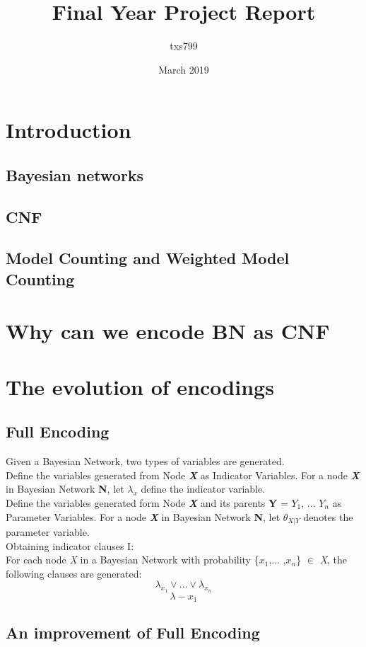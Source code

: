 \documentclass{article}
\title{Final Year Project Report}
\author{txs799 }
\date{March 2019}
\begin{document}
\maketitle

\section{Introduction}
\subsection{Bayesian networks}
\subsection{CNF}
\subsection{Model Counting and Weighted Model Counting}

\section{Why can we encode BN as CNF}

\section{The evolution of encodings}
\subsection{Full Encoding}
Given a Bayesian Network, two types of variables are generated.\\
Define the variables generated from Node \textbf{\textit{X}} as Indicator Variables.
For a node \textbf{\textit{X}} in Bayesian Network \textbf{N}, let $\lambda_x$ define the indicator variable. \\
Define the variables generated form Node \textbf{\textit{X}} and its parents \textbf{Y} = {$Y_{1}$, ... $Y_{n}$} as Parameter Variables.
For a node \textbf{\textit{X}} in Bayesian Network \textbf{N}, let $\theta_{X|Y}$ denotes the parameter variable.\\
Obtaining indicator clauses \textsc{I}:\\
For each node \textit{X} in a Bayesian Network with probability \{$x_{1}$,... ,$x_{n}$\} $\in$ \textit{X}, the following clauses are generated:
$$\lambda_{x_{1}} \vee ... \vee \lambda_{x_{n}}$$
$$\lambda-{x_{1}}$$
\subsection{An improvement of Full Encoding}
\end{document}
